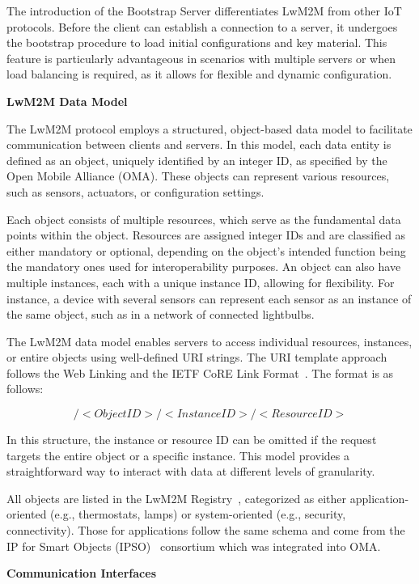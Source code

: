 \documentclass[11pt,sigconf]{iabart}
\begin{document}
The introduction of the Bootstrap Server differentiates LwM2M from other IoT protocols. Before the client can establish a connection to a server, it undergoes the bootstrap procedure to load initial configurations and key material. This feature is particularly advantageous in scenarios with multiple servers or when load balancing is required, as it allows for flexible and dynamic configuration.

\textbf{LwM2M Data Model}

The LwM2M protocol employs a structured, object-based data model to facilitate communication between clients and servers. In this model, each data entity is defined as an object, uniquely identified by an integer ID, as specified by the Open Mobile Alliance (OMA). These objects can represent various resources, such as sensors, actuators, or configuration settings.

Each object consists of multiple resources, which serve as the fundamental data points within the object. Resources are assigned integer IDs and are classified as either mandatory or optional, depending on the object's intended function being the mandatory ones used for interoperability purposes. An object can also have multiple instances, each with a unique instance ID, allowing for flexibility. For instance, a device with several sensors can represent each sensor as an instance of the same object, such as in a network of connected lightbulbs.

The LwM2M data model enables servers to access individual resources, instances, or entire objects using well-defined URI strings. The URI template approach follows the Web Linking and the IETF CoRE Link Format~\cite{rfc6690}. The format is as follows:

\[
/<Object ID>/<Instance ID>/<Resource ID>
\]

In this structure, the instance or resource ID can be omitted if the request targets the entire object or a specific instance. This model provides a straightforward way to interact with data at different levels of granularity.

All objects are listed in the LwM2M Registry~\cite{lwm2m-registry}, categorized as either application-oriented (e.g., thermostats, lamps) or system-oriented (e.g., security, connectivity). Those for applications follow the same schema and come from the IP for Smart Objects (IPSO)~\cite{ipso} consortium which was integrated into OMA. 

\textbf{Communication Interfaces}
\end{document}
